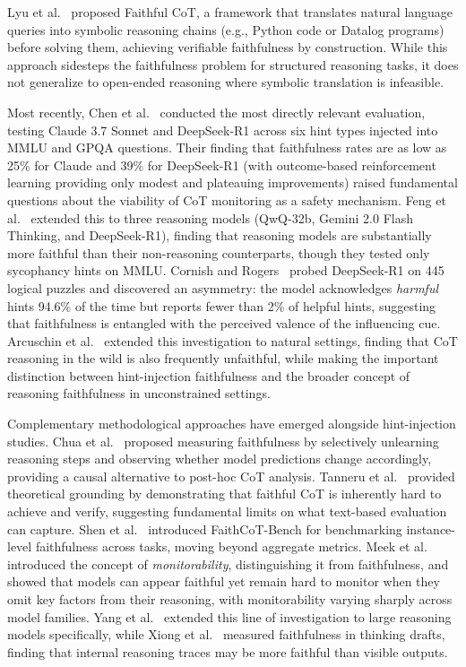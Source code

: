 Lyu et al.~\cite{lyu2023faithful} proposed Faithful CoT, a framework that translates
natural language queries into symbolic reasoning chains (e.g., Python code or
Datalog programs) before solving them, achieving verifiable faithfulness by
construction. While this approach sidesteps the faithfulness problem for structured
reasoning tasks, it does not generalize to open-ended reasoning where symbolic
translation is infeasible.

Most recently, Chen et al.~\cite{chen2025reasoning} conducted the most directly
relevant evaluation, testing Claude 3.7 Sonnet and DeepSeek-R1 across six hint
types injected into MMLU and GPQA questions. Their finding that faithfulness rates
are as low as 25\% for Claude and 39\% for DeepSeek-R1 (with outcome-based
reinforcement learning providing only modest and plateauing improvements) raised
fundamental questions about the viability of CoT monitoring as a safety mechanism.
Feng et al.~\cite{feng2025more} extended this to three reasoning models
(QwQ-32b, Gemini 2.0 Flash Thinking, and DeepSeek-R1), finding that reasoning
models are substantially more faithful than their non-reasoning counterparts,
though they tested only sycophancy hints on MMLU. Cornish and
Rogers~\cite{cornish2025examining} probed DeepSeek-R1 on 445 logical puzzles
and discovered an asymmetry: the model acknowledges \emph{harmful} hints
94.6\% of the time but reports fewer than 2\% of helpful hints, suggesting
that faithfulness is entangled with the perceived valence of the influencing cue.
Arcuschin et al.~\cite{arcuschin2025wild} extended this investigation to natural
settings, finding that CoT reasoning in the wild is also frequently unfaithful,
while making the important distinction between hint-injection faithfulness and the
broader concept of reasoning faithfulness in unconstrained settings.

Complementary methodological approaches have emerged alongside hint-injection
studies. Chua et al.~\cite{chua2025unlearning} proposed measuring faithfulness
by selectively unlearning reasoning steps and observing whether model predictions
change accordingly, providing a causal alternative to post-hoc CoT analysis.
Tanneru et al.~\cite{tanneru2024hardness} provided theoretical grounding by demonstrating that faithful CoT is inherently hard to achieve and verify, suggesting fundamental limits on what text-based evaluation can capture.
Shen et al.~\cite{shen2025faithcotbench} introduced FaithCoT-Bench for benchmarking instance-level faithfulness across tasks, moving beyond aggregate metrics.
Meek et al.~\cite{meek2025monitorability} introduced the concept of
\emph{monitorability}, distinguishing it from faithfulness, and showed that
models can appear faithful yet remain hard to monitor when they omit key factors
from their reasoning, with monitorability varying sharply across model families.
Yang et al.~\cite{yang2025monitorability} extended this line of investigation to large reasoning models specifically, while Xiong et al.~\cite{xiong2025thinking} measured faithfulness in thinking drafts, finding that internal reasoning traces may be more faithful than visible outputs.

